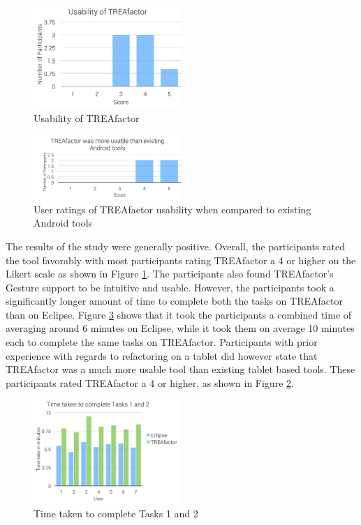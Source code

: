\documentclass[10.5pt,twocolumn]{article}
\begin{document}
\begin{figure}
    \centering
    \includegraphics[width=0.5\textwidth]{tfusability}
    \caption{Usability of TREAfactor}
    \label{fig:tf4}
\end{figure}

\begin{figure}
    \centering
    \includegraphics[width=0.5\textwidth]{tfvsandroid}
    \caption{User ratings of TREAfactor usability when compared to existing Android tools}
    \label{fig:tf5}
\end{figure}

The results of the study were generally positive. Overall, the participants rated the tool favorably with most participants rating TREAfactor a 4 or higher on the Likert scale as shown in Figure \ref{fig:tf4}. The participants also found TREAfactor’s Gesture support to be intuitive and usable. However, the participants took a significantly longer amount of time to complete both the tasks on TREAfactor than on Eclipse. Figure \ref{fig:tf3} shows that it took the participants a combined time of averaging around 6 minutes on Eclipse, while it took them on average 10 minutes each to complete the same tasks on TREAfactor. Participants with prior experience with regards to refactoring on a tablet did however state that TREAfactor was a much more usable tool than existing tablet based tools. These participants rated TREAfactor a 4 or higher, as shown in Figure \ref{fig:tf5}.

\begin{figure}
    \centering
    \includegraphics[width=0.5\textwidth]{timefortasks}
    \caption{Time taken to complete Tasks 1 and 2}
    \label{fig:tf3}
\end{figure}
\end{document}

